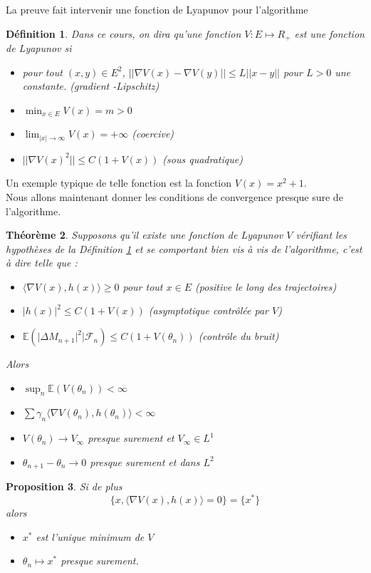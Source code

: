\documentclass[a4paper,12pt]{book}
\newtheorem{thmfr}{Théorème}[section]
\newtheorem{defnfr}[thmfr]{Définition}
\newtheorem{propfr}[thmfr]{Proposition}
\newcommand{\E}{\mathbb{E}}
\newcommand{\Fc}{\mathcal{F}}
\begin{document}
La preuve fait intervenir une fonction de Lyapunov pour l'algorithme
\begin{defnfr}
\label{def:lyap}
Dans ce cours, on dira qu'une fonction $V:E\mapsto R_+$ est une fonction de Lyapunov si
\begin{itemize}
\item[i)] pour tout $(x,y)\in E^2$, $\lvert \lvert \nabla V(x)-\nabla V(y)\lvert\lvert \le L \lvert \lvert x-y\lvert\lvert$ pour $L>0$ une constante. (gradient -Lipschitz)
\item[ii)] $\min_{x\in E} V(x) = m>0$
\item[iii)] $\lim_{\lvert x\lvert \to \infty} V(x)=+\infty$ (coercive)
\item[iv)] $ \lvert \lvert \nabla V(x)^2\lvert\lvert \le C(1+V(x)) $ (sous quadratique)
\end{itemize}
\end{defnfr}
Un exemple typique de telle fonction est la fonction $V(x)=x^2+1$.\medskip\\

Nous allons maintenant donner les conditions de convergence presque sure de l'algorithme.
\begin{thmfr}
\label{thm:RM}
Supposons qu'il existe une fonction de Lyapunov $V$ vérifiant les hypothèses de la Définition \ref{def:lyap} et se comportant bien vis à vis de l'algorithme, c'est à dire telle que :
\begin{itemize}
\item[1)]$\langle \nabla V(x), h(x) \rangle \ge0$ pour tout $x\in E$ (positive le long des trajectoires)
\item[2)]$\lvert h(x)\lvert^2 \le C(1+V(x))$ (asymptotique contrôlée par $V$)
\item[3)]$\E(\lvert\Delta M_{n+1}\lvert^2\lvert \Fc_n)\le C(1+V(\theta_n))$ (contrôle du bruit)
\end{itemize}
Alors
\begin{itemize}
\item[a)] $\sup_n \E(V(\theta_n))<\infty$
\item[b)] $\sum \gamma_n \langle \nabla V(\theta_n),h(\theta_n)\rangle <\infty$
\item[c)]$ V(\theta_n)\to V_\infty $ presque surement et $V_\infty\in L^1$
\item[d)] $\theta_{n+1}-\theta_n \to 0$ presque surement et dans $L^2$
\end{itemize}
\end{thmfr}
\begin{propfr}
\label{prop:RM}
Si de plus $$\{x, \langle \nabla V(x),h(x)\rangle=0\}=\{x^*\}$$ alors
\begin{itemize}
\item[e)] $x^*$ est l'unique minimum de $V$
\item[f)] $\theta_n\mapsto x^*$ presque surement.
\end{itemize}
\end{propfr}
\end{document}
